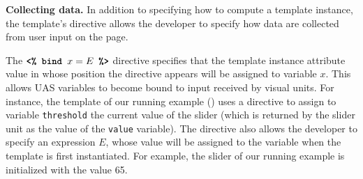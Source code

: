 


{\bf Collecting data.} In addition to specifying how to compute a template instance, the template's  directive allows the developer to specify how data are collected from user input on the page.

The $\texttt{\textbf{<\% bind }} x = E \texttt{\textbf{ \%>}}$ directive specifies that the template instance attribute value in whose position the directive appears will be assigned to variable $x$. This allows UAS variables to become bound to input received by visual units.    For instance, the template of our running example () uses a  directive to assign to variable \texttt{threshold} the current value of the slider (which is returned by the slider unit as the value of the \texttt{value} variable). The  directive also allows the developer to specify an expression $E$, whose value will be assigned to the variable when the template is first instantiated. For example, the slider of our running example is initialized with the value 65.\\

